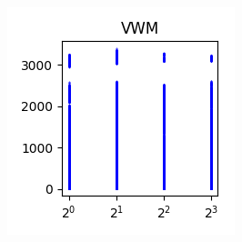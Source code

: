 \documentclass[sigconf,authorversion]{acmart}
\begin{document}
\begin{figure}[htb]
\begin{subfigure}[b]{0.3\textwidth}
        \label{fig:kwi}
    \end{subfigure}
    \begin{subfigure}[b]{0.3\textwidth}
        \includegraphics[width=\textwidth]{img/VWM.png}
        \label{fig:vwm}
    \end{subfigure}
\end{figure}
\end{document}
